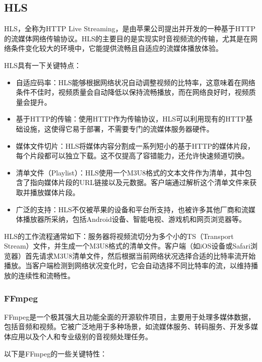 \documentclass[main.tex]{subfiles}
\begin{document}
\subsection{HLS}

HLS，全称为HTTP Live Streaming，是由苹果公司提出并开发的一种基于HTTP的流媒体网络传输协议。HLS的主要目的是实现实时音视频流的传输，尤其是在网络条件变化较大的环境中，它能提供流畅且自适应的流媒体播放体验。

HLS具有一下关键特点：
\begin{itemize}
    \item 自适应码率：HLS能够根据网络状况自动调整视频的比特率，这意味着在网络条件不佳时，视频质量会自动降低以保持流畅播放，而在网络良好时，视频质量会提升。
    \item 基于HTTP的传输：使用HTTP作为传输协议，HLS可以利用现有的HTTP基础设施，这使得它易于部署，不需要专门的流媒体服务器硬件。
    \item 媒体文件切片：HLS将媒体内容分割成一系列短小的基于HTTP的媒体片段，每个片段都可以独立下载。这不仅提高了容错能力，还允许快速频道切换。
    \item 清单文件（Playlist）：HLS使用一个M3U8格式的文本文件作为清单，其中包含了指向媒体片段的URL链接以及元数据。客户端通过解析这个清单文件来获取并播放媒体片段。
    \item 广泛的支持：HLS不仅被苹果的设备和平台所支持，也被许多其他厂商和流媒体播放器所采纳，包括Android设备、智能电视、游戏机和网页浏览器等。
\end{itemize}

HLS的工作流程通常如下：服务器将视频流切分为多个小的TS（Transport Stream）文件，并生成一个M3U8格式的清单文件。客户端（如iOS设备或Safari浏览器）首先请求M3U8清单文件，然后根据当前网络状况选择合适的比特率流开始播放。当客户端检测到网络状况变化时，它会自动选择不同比特率的流，以维持播放的连续性和流畅性。

\subsubsection{FFmpeg}

FFmpeg是一个极其强大且功能全面的开源软件项目，主要用于处理多媒体数据，包括音频和视频。它被广泛地用于多种场景，如流媒体服务、转码服务、开发多媒体应用以及个人和专业级别的音视频处理任务。

以下是FFmpeg的一些关键特性：
\end{document}
